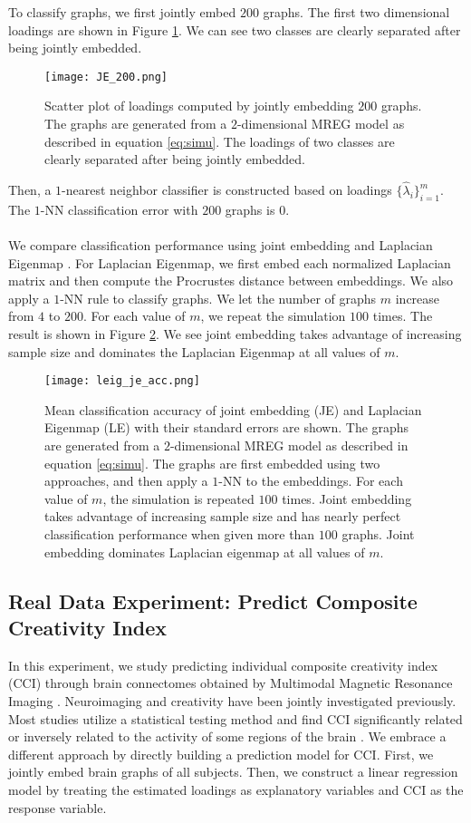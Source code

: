 \documentclass[10pt,journal,compsoc]{IEEEtran}
\begin{document}
\noindent To classify graphs, we first jointly embed $200$ graphs. The first two dimensional loadings are shown in Figure \ref{fig:load}. We can see two classes are clearly separated after being jointly embedded.
\begin{figure}[!htbp]
	\centering
	\texttt{[image: JE\_200.png]}
	\caption{Scatter plot of loadings computed by jointly embedding $200$ graphs. The graphs are generated from a $2$-dimensional MREG model as described in equation \ref{eq:simu}. The loadings of two classes are clearly separated after being jointly embedded. }
	\label{fig:load}
\end{figure}
Then, a $1$-nearest neighbor classifier is constructed based on loadings $\{\hat{\lambda}_i\}_{i=1}^m$. The $1$-NN classification error with $200$ graphs is $0$. \\
\\
\noindent We compare classification performance using joint embedding and Laplacian Eigenmap \cite{belkin2003laplacian}. For Laplacian Eigenmap, we first embed each normalized Laplacian matrix and then compute the Procrustes distance between embeddings. We also apply a $1$-NN rule to classify graphs. We let the number of graphs $m$ increase from $4$ to $200$. For each value of $m$, we repeat the simulation $100$ times. The result is shown in Figure \ref{fig:acc}. We see joint embedding takes advantage of increasing sample size and dominates the Laplacian Eigenmap at all values of $m$. 
\begin{figure}[!htbp]
	\centering
	\texttt{[image: leig\_je\_acc.png]}
	\caption{Mean classification accuracy of joint embedding (JE) and Laplacian Eigenmap (LE) with their standard errors are shown. The graphs are generated from a $2$-dimensional MREG model as described in equation \ref{eq:simu}. The graphs are first embedded using two approaches, and then apply a $1$-NN to the embeddings. For each value of $m$, the simulation is repeated $100$ times. Joint embedding takes advantage of increasing sample size and has nearly perfect classification performance when given more than $100$ graphs. Joint embedding dominates Laplacian eigenmap at all values of $m$.}
	\label{fig:acc}
\end{figure} 

\subsection{Real Data Experiment: Predict Composite Creativity Index}
In this experiment, we study predicting individual composite creativity index (CCI) through brain connectomes obtained by Multimodal Magnetic Resonance Imaging \cite{koutra2013d}. Neuroimaging and creativity have been jointly investigated previously. Most studies utilize a statistical testing method and find CCI significantly related or inversely related to the activity of some regions of the brain \cite{arden2010neuroimaging}. We embrace a different approach by directly building a prediction model for CCI. First, we jointly embed brain graphs of all subjects. Then, we construct a linear regression model by treating the estimated loadings as explanatory variables and CCI as the response variable. \\
\end{document}

